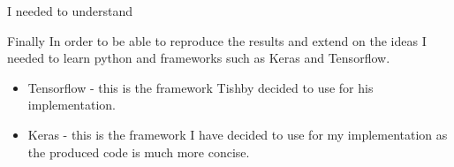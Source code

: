 I needed to understand 

Finally In order to be able to reproduce the results and extend on the ideas I
needed to learn python and frameworks such as Keras and Tensorflow.
\begin{itemize}
  \item{
      Tensorflow - this is the framework Tishby decided to use for
      his implementation.
    }
  \item{
      Keras - this is the framework I have decided to use for my implementation
      as the produced code is much more concise.
    }
\end{itemize}


